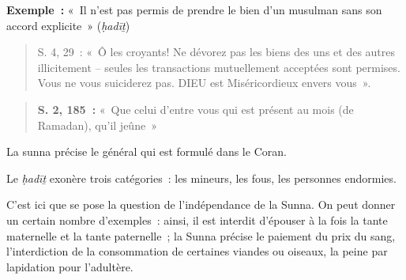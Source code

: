 
\textbf{Exemple~:} «~Il n'est pas permis de prendre le bien d'un
musulman sans son accord explicite~» (\emph{ḥadīṯ})
\begin{quote}
   S. 4, 29~: «~Ô les croyants! Ne dévorez pas les biens des uns et des
autres illicitement -- seules les transactions mutuellement acceptées
sont permises. Vous ne vous suiciderez pas. DIEU est Miséricordieux
envers vous~».
 
\end{quote}

\begin{quote}
  \textbf{S. 2, 185~:} «~Que celui d'entre vous qui est présent au mois
(de Ramadan), qu'il jeûne~»

  
\end{quote}

La sunna précise le général qui est formulé dans le Coran.

Le \emph{ḥadīṯ} exonère trois catégories~: les mineurs, les fous, les
personnes endormies.


C'est ici que se pose la question de l'indépendance de la Sunna. On peut
donner un certain nombre d'exemples~: ainsi, il est interdit d'épouser à
la fois la tante maternelle et la tante paternelle~; la Sunna précise le
paiement du prix du sang, l'interdiction de la consommation de certaines
viandes ou oiseaux, la peine par lapidation pour l'adultère.

